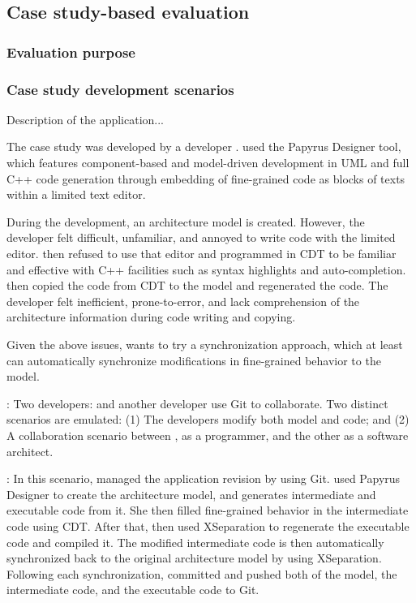 \subsection{Case study-based evaluation}

\subsubsection{Evaluation purpose}

\subsubsection{Case study development scenarios}

Description of the application...

The case study was developed by a developer . 
 used the Papyrus Designer tool, which features component-based and model-driven development in UML and full C++ code generation through embedding of fine-grained code as blocks of texts within a limited text editor.   

During the development, an architecture model is created.
However, the developer felt difficult, unfamiliar, and annoyed to write code with the limited editor.
 then refused to use that editor and programmed in CDT to be familiar and effective with C++ facilities such as syntax highlights and auto-completion.
 then copied the code from CDT to the model and regenerated the code.
The developer felt inefficient, prone-to-error, and lack comprehension of the architecture information during code writing and copying.

Given the above issues,  wants to try a synchronization approach, which at least can automatically synchronize modifications in fine-grained behavior to the model.

\vskip 0.1cm
\noindent
{}:
Two developers:  and another developer use Git to collaborate. 
Two distinct scenarios are emulated: (1) The developers modify both model and code; and (2) A collaboration scenario between , as a programmer, and the other as a software architect. 


\vskip 0.1cm
\noindent
{}:
In this scenario,  managed the application revision by using Git.
 used Papyrus Designer to create the architecture model, and generates intermediate and executable code from it.
She then filled fine-grained behavior in the intermediate code using CDT.
After that,  then used XSeparation to regenerate the executable code and compiled it.
The modified intermediate code is then automatically synchronized back to the original architecture model by using XSeparation.
Following each synchronization,  committed and pushed both of the model, the intermediate code, and the executable code to Git.  

